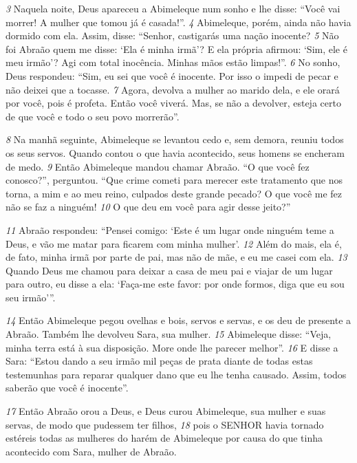 \bigskip   
\textit{\tiny 3}
Naquela noite, Deus apareceu a Abimeleque num sonho e lhe disse: “Você vai
morrer! A mulher que tomou já é casada!”.
\textit{\tiny 4}
Abimeleque, porém, ainda não havia dormido com ela. Assim, disse: “Senhor,
castigarás uma nação inocente? 
\textit{\tiny 5}
Não foi Abraão quem me disse: ‘Ela é minha
irmã’? E ela própria afirmou: ‘Sim, ele é meu irmão’? Agi com total inocência.
Minhas mãos estão limpas!”.
\textit{\tiny 6}
No sonho, Deus respondeu: “Sim, eu sei que você é inocente. Por isso o impedi
de pecar e não deixei que a tocasse. 
\textit{\tiny 7}
Agora, devolva a mulher ao marido dela, e ele
orará por você, pois é profeta. Então você viverá. Mas, se não a devolver, esteja
certo de que você e todo o seu povo morrerão”.

\bigskip   
\textit{\tiny 8}
Na manhã seguinte, Abimeleque se levantou cedo e, sem demora, reuniu todos
os seus servos. Quando contou o que havia acontecido, seus homens se encheram
de medo. 
\textit{\tiny 9}
Então Abimeleque mandou chamar Abraão. “O que você fez conosco?”,
perguntou. “Que crime cometi para merecer este tratamento que nos torna, a
mim e ao meu reino, culpados deste grande pecado? O que você me fez não se faz
a ninguém! 
\textit{\tiny 10}
O que deu em você para agir desse jeito?”

\bigskip   
\textit{\tiny 11}
Abraão respondeu: “Pensei comigo: ‘Este é um lugar onde ninguém teme a
Deus, e vão me matar para ficarem com minha mulher’. 
\textit{\tiny 12}
Além do mais, ela é, de
fato, minha irmã por parte de pai, mas não de mãe, e eu me casei com ela.
\textit{\tiny 13}
Quando Deus me chamou para deixar a casa de meu pai e viajar de um lugar para outro, eu disse a ela: ‘Faça-me este favor: por onde formos, diga que eu sou
seu irmão’”.

\bigskip   
\textit{\tiny 14}
Então Abimeleque pegou ovelhas e bois, servos e servas, e os deu de presente
a Abraão. Também lhe devolveu Sara, sua mulher. 
\textit{\tiny 15}
Abimeleque disse: “Veja,
minha terra está à sua disposição. More onde lhe parecer melhor”. 
\textit{\tiny 16}
E disse a
Sara: “Estou dando a seu irmão mil peças de prata diante de todas estas
testemunhas para reparar qualquer dano que eu lhe tenha causado. Assim, todos
saberão que você é inocente”.

\bigskip   
\textit{\tiny 17}
Então Abraão orou a Deus, e Deus curou Abimeleque, sua mulher e suas
servas, de modo que pudessem ter filhos, 
\textit{\tiny 18}
pois o SENHOR havia tornado estéreis
todas as mulheres do harém de Abimeleque por causa do que tinha acontecido
com Sara, mulher de Abraão.
   
